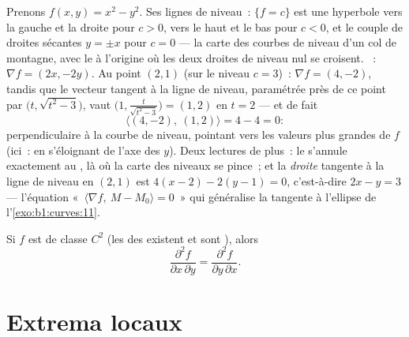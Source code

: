 \begin{example}
\label{ex:b1:multivar:levelcurves}
Prenons $f(x, y) = x^2 - y^2$. Ses lignes de niveau~: $\{f = c\}$
est une hyperbole  vers la gauche et la droite pour $c >
0$, vers le haut et le bas pour $c < 0$, et le couple de droites
sécantes $y = \pm x$ pour $c = 0$ --- la carte des courbes de
niveau d'un col de montagne, avec le  à l'origine où les
deux droites de niveau nul se croisent. ~: $\nabla
f = (2x, -2y)$. Au point $(2, 1)$ (sur le niveau $c = 3$)~:
$\nabla f = (4, -2)$, tandis que le vecteur tangent à la ligne de
niveau, paramétrée près de ce point par $\bigl(t,
\sqrt{t^2 - 3}\bigr)$, vaut $\bigl(1, \frac{t}{\sqrt{t^2 -
3}}\bigr) = (1, 2)$ en $t = 2$ --- et de fait
\[
\langle (4, -2),\ (1, 2)\rangle = 4 - 4 = 0 :
\]
 perpendiculaire à la courbe de niveau, pointant vers les
valeurs plus grandes de $f$ (ici~: en s'éloignant de l'axe des
$y$). Deux lectures de plus~: le  s'annule exactement au
, là où la carte des niveaux se pince~; et la
\emph{droite} tangente à la ligne de niveau en $(2,1)$ est
$4(x - 2) - 2(y - 1) = 0$, c'est-à-dire $2x - y = 3$ ---
l'équation «~$\langle \nabla f,\ M - M_0\rangle = 0$~» qui
généralise la tangente à l'ellipse de l'\cref{exo:b1:curves:11}.
\end{example}

\begin{theorem}[Schwarz]\label{thm:b1:multivar:schwarz}
Si $f$ est de classe $C^2$ (les  des  existent et sont ),
alors
\[
\frac{\partial^2 f}{\partial x\,\partial y}
= \frac{\partial^2 f}{\partial y\,\partial x} .
\]
\end{theorem}
\admitted

\section{Extrema locaux}

